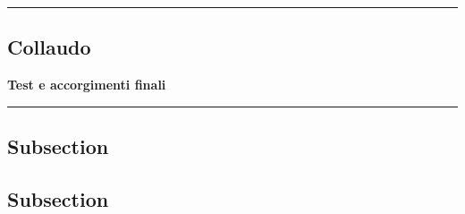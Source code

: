 {\color{gray}\hrule}
\begin{center}
\section{Collaudo}
\textbf{Test e accorgimenti finali}
\bigskip
\end{center}
{\color{gray}\hrule}

\subsection{Subsection}
\lipsum[1]
\subsection{Subsection}
\lipsum[1-3]

\pagebreak